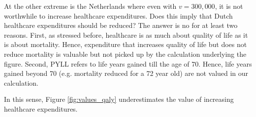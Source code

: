 \documentclass[a4paper,12pt]{article}
\begin{document}
At the other extreme is the Netherlands where even with \(v = 300,000\), it is not worthwhile to increase healthcare expenditures. Does this imply that Dutch healthcare expenditures should be reduced? The answer is no for at least two reasons. First, as stressed before, healthcare is as much about quality of life as it is about mortality. Hence, expenditure that increases quality of life but does not reduce mortality is valuable but not picked up by the calculation underlying the figure. Second, PYLL refers to life years gained till the age of 70. Hence, life years gained beyond 70 (e.g. mortality reduced for a 72 year old) are not valued in our calculation.

In this sense, Figure \ref{fig:values_qaly} underestimates the value of increasing healthcare expenditures.
\end{document}
